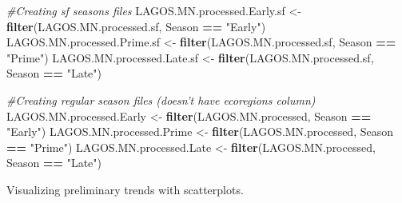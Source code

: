 \documentclass[12pt,]{article}
\newenvironment{Shaded}{\begin{snugshade}}{\end{snugshade}}
\newcommand{\CommentTok}[1]{\textcolor[rgb]{0.56,0.35,0.01}{\textit{#1}}}
\newcommand{\DataTypeTok}[1]{\textcolor[rgb]{0.13,0.29,0.53}{#1}}
\newcommand{\FloatTok}[1]{\textcolor[rgb]{0.00,0.00,0.81}{#1}}
\newcommand{\KeywordTok}[1]{\textcolor[rgb]{0.13,0.29,0.53}{\textbf{#1}}}
\newcommand{\NormalTok}[1]{#1}
\newcommand{\OperatorTok}[1]{\textcolor[rgb]{0.81,0.36,0.00}{\textbf{#1}}}
\newcommand{\StringTok}[1]{\textcolor[rgb]{0.31,0.60,0.02}{#1}}
\begin{document}
\begin{Shaded}
\begin{Highlighting}[]
\CommentTok{#Creating sf seasons files}
\NormalTok{LAGOS.MN.processed.Early.sf <-}\StringTok{ }\KeywordTok{filter}\NormalTok{(LAGOS.MN.processed.sf, Season }\OperatorTok{==}\StringTok{ "Early"}\NormalTok{)}
\NormalTok{LAGOS.MN.processed.Prime.sf <-}\StringTok{ }\KeywordTok{filter}\NormalTok{(LAGOS.MN.processed.sf, Season }\OperatorTok{==}\StringTok{ "Prime"}\NormalTok{)}
\NormalTok{LAGOS.MN.processed.Late.sf <-}\StringTok{ }\KeywordTok{filter}\NormalTok{(LAGOS.MN.processed.sf, Season }\OperatorTok{==}\StringTok{ "Late"}\NormalTok{)}

\CommentTok{#Creating regular season files (doesn't have ecoregions column)}
\NormalTok{LAGOS.MN.processed.Early <-}\StringTok{ }\KeywordTok{filter}\NormalTok{(LAGOS.MN.processed, Season }\OperatorTok{==}\StringTok{ "Early"}\NormalTok{)}
\NormalTok{LAGOS.MN.processed.Prime <-}\StringTok{ }\KeywordTok{filter}\NormalTok{(LAGOS.MN.processed, Season }\OperatorTok{==}\StringTok{ "Prime"}\NormalTok{)}
\NormalTok{LAGOS.MN.processed.Late <-}\StringTok{ }\KeywordTok{filter}\NormalTok{(LAGOS.MN.processed, Season }\OperatorTok{==}\StringTok{ "Late"}\NormalTok{)}
\end{Highlighting}
\end{Shaded}

Visualizing preliminary trends with scatterplots.

\begin{Shaded}
\end{Shaded}
\end{document}
